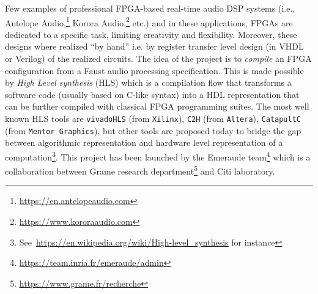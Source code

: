 


Few examples of professional FPGA-based real-time audio DSP systems (i.e., Antelope Audio,\footnote{\url{https://en.antelopeaudio.com}} Korora Audio,\footnote{\url{https://www.kororaaudio.com}} etc.) and in these applications, FPGAs are dedicated to a specific task, limiting creativity and flexibility. Moreover, these designs where realized ``by hand'' i.e. by register transfer level design (in VHDL or Verilog) of the realized circuits. The idea of the \syfala project is to {\em compile} an FPGA configuration from a Faust audio processing specification. This is made possible by {\em High Level synthesis} (HLS) which is a compilation flow that transforms a software code (usually based on C-like syntax) into a HDL representation that can be further compiled with classical FPGA programming suites. The most well known HLS tools are {\tt vivadoHLS} (from {\tt Xilinx}), {\tt C2H} (from {\tt Altera}), {\tt CatapultC} (from {\tt Mentor Graphics}), but other tools are proposed today to bridge the gap between algorithmic representation and hardware level representation of a computation\footnote{See~\url{https://en.wikipedia.org/wiki/High-level_synthesis} for instance}. 
This project has been launched by the Emeraude team\footnote{\url{https://team.inria.fr/emeraude/admin}} which is  a collaboration between Grame research department\footnote{\url{https://www.grame.fr/recherche}} and Citi laboratory.
